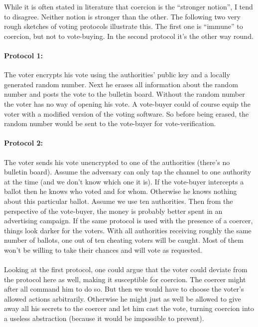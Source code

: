\documentclass{article}
\begin{document}
While it is often stated in literature that coercion is the ``stronger notion'', I tend to disagree. Neither notion is stronger than the other. The following two very rough sketches of voting protocols illustrate this. The first one is ``immune'' to coercion, but not to vote-buying. In the second protocol it's the other way round.

\paragraph{Protocol 1:}
The voter encrypts his vote using the authorities' public key and a locally generated random number. Next he erases all information about the random number and posts the vote to the bulletin board. Without the random number the voter has no way of opening his vote.
A vote-buyer could of course equip the voter with a modified version of the voting software. So before being erased, the random number would be sent to the vote-buyer for vote-verification.

\paragraph{Protocol 2:}
The voter sends his vote unencrypted to one of the authorities (there's no bulletin board). Assume the adversary can only tap the channel to one authority at the time (and we don't know which one it is). If the vote-buyer intercepts a ballot then he knows who voted and for whom. Otherwise he knows nothing about this particular ballot. Assume we use ten authorities. Then from the perspective of the vote-buyer, the money is probably better spent in an advertising campaign.
If the same protocol is used with the presence of a coercer, things look darker for the voters. With all authorities receiving roughly the same number of ballots, one out of ten cheating voters will be caught. Most of them won't be willing to take their chances and will vote as requested.

\paragraph{}
Looking at the first protocol, one could argue that the voter could deviate from the protocol here as well, making it susceptible for coercion. The coercer might after all command him to do so. But then we would have to choose the voter's allowed actions arbitrarily. Otherwise he might just as well be allowed to give away all his secrets to the coercer and let him cast the vote, turning coercion into a useless abstraction (because it would be impossible to prevent).
\end{document}
